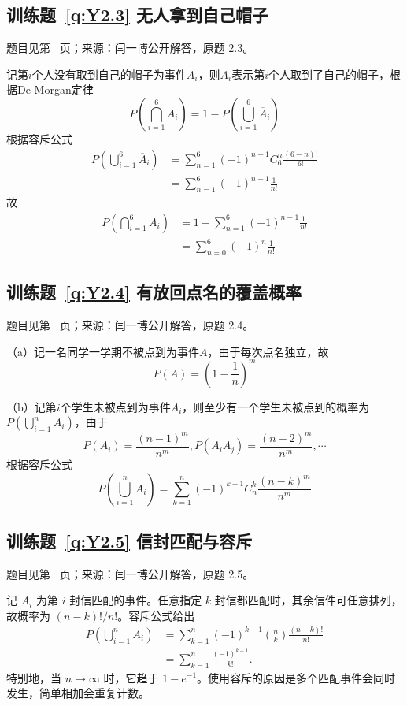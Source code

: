 \documentclass[UTF8,12pt,a4paper,fontset=fandol]{ctexbook}
\begin{document}
\subsection*{训练题~\ref{q:Y2.3} 无人拿到自己帽子}\label{a:Y2.3}{\small 题目见第~\pageref{q:Y2.3} 页；来源：闫一博公开解答，原题 2.3。}
\begin{solve}
记第$i$个人没有取到自己的帽子为事件$A_i$，则$\overline{A}_i$表示第$i$个人取到了自己的帽子，根据De Morgan定律
\[P(\bigcap\limits_{i = 1}^6 {{A_i}} ) = 1 - P(\bigcup\limits_{i = 1}^6 {{{\overline A }_i}} )\]
根据容斥公式
\[\begin{aligned}P(\bigcup\limits_{i = 1}^6 {{{\overline A }_i}} ) &= \sum\limits_{n = 1}^6 {{{( - 1)}^{n - 1}}C_6^n\frac{{(6 - n)!}}{{6!}}}  \\&= \sum\limits_{n = 1}^6 {{{( - 1)}^{n - 1}}\frac{1}{{n!}}} \end{aligned}\]
故
\[\begin{aligned}P(\bigcap\limits_{i = 1}^6 {{A_i}} ) &= 1 - \sum\limits_{n = 1}^6 {{{( - 1)}^{n - 1}}\frac{1}{{n!}}}  \\&= \sum\limits_{n = 0}^6 {{{( - 1)}^n}\frac{1}{{n!}}} \end{aligned}\]
\end{solve}

\subsection*{训练题~\ref{q:Y2.4} 有放回点名的覆盖概率}\label{a:Y2.4}{\small 题目见第~\pageref{q:Y2.4} 页；来源：闫一博公开解答，原题 2.4。}
\begin{solve}
（a）记一名同学一学期不被点到为事件$A$，由于每次点名独立，故
\[P(A) = {\left( {1 - \frac{1}{n}} \right)^m}\]

（b）记第$i$个学生未被点到为事件$A_i$，则至少有一个学生未被点到的概率为$P(\bigcup\limits_{i = 1}^n {{A_i}})$，由于\[P({A_i}) = \frac{{{{(n - 1)}^m}}}{{{n^m}}},P({A_i}{A_j}) = \frac{{{{(n - 2)}^m}}}{{{n^m}}}, \cdots \]根据容斥公式
\[P(\bigcup\limits_{i = 1}^n {{A_i}} ) = \sum\limits_{k = 1}^n {{{( - 1)}^{k - 1}}} C_n^k\frac{{{{(n - k)}^m}}}{{{n^m}}}\]
\end{solve}

\subsection*{训练题~\ref{q:Y2.5} 信封匹配与容斥}\label{a:Y2.5}{\small 题目见第~\pageref{q:Y2.5} 页；来源：闫一博公开解答，原题 2.5。}
\begin{solve}记 $A_i$ 为第 $i$ 封信匹配的事件。任意指定 $k$ 封信都匹配时，其余信件可任意排列，故概率为 $(n-k)!/n!$。容斥公式给出\[\begin{aligned}P\left(\bigcup_{i=1}^nA_i\right)&=\sum_{k=1}^n(-1)^{k-1}\binom nk\frac{(n-k)!}{n!}\\&=\sum_{k=1}^n\frac{(-1)^{k-1}}{k!}.\end{aligned}\]特别地，当 $n\to\infty$ 时，它趋于 $1-e^{-1}$。使用容斥的原因是多个匹配事件会同时发生，简单相加会重复计数。\end{solve}
\end{document}
